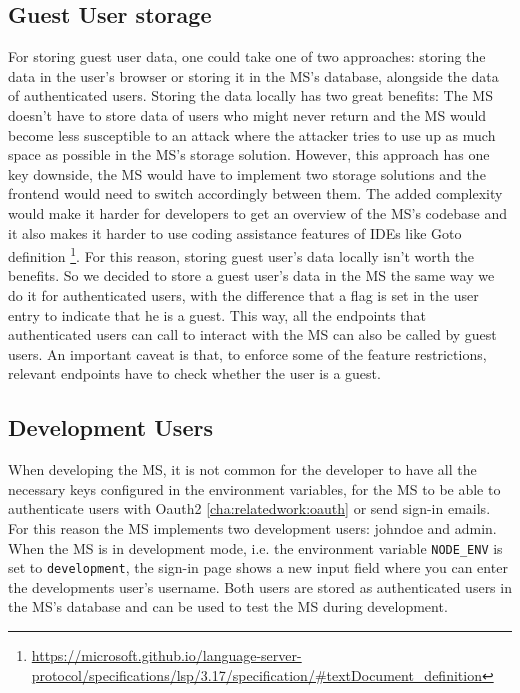 \subsection{Guest User storage}

For storing guest user data, one could take one of two approaches:
storing the data in the user's browser or storing it in the MS's database, alongside the
data of authenticated users.
Storing the data locally has two great benefits: 
The MS doesn't have to store data of users who might never return and
the MS would become less susceptible to an attack where the attacker tries to use up as
much space as possible in the MS's storage solution.
However, this approach has one key downside, the MS would have to implement two storage
solutions and the frontend would need to switch accordingly between them.
The added complexity would make it harder for developers to get an overview of the MS's
codebase and it also makes it harder to use coding assistance features of IDEs like Goto
definition \footnote{\url{https://microsoft.github.io/language-server-protocol/specifications/lsp/3.17/specification/\#textDocument_definition}}.
For this reason, storing guest user's data locally isn't worth the benefits.
So we decided to store a guest user's data in the MS the same way we do it for
authenticated users,
with the difference that a flag is set in the user entry to indicate that he is a guest.
This way, all the endpoints that authenticated users can call to interact with the MS
can also be called by guest users.
An important caveat is that, to enforce some of the feature restrictions, relevant
endpoints have to check whether the user is a guest.

\subsection{Development Users}

When developing the MS, it is not common for the developer to have all the necessary keys
configured in the environment variables, for the MS to be able to authenticate users with
Oauth2 \ref{cha:relatedwork:oauth} or send sign-in emails.
For this reason the MS implements two development users: johndoe and admin.
When the MS is in development mode, i.e. the environment variable \lstinline{NODE_ENV} is
set to \lstinline{development},
the sign-in page shows a new input field where you can enter the developments user's username.
Both users are stored as authenticated users in the MS's database and can be used to test
the MS during development.


